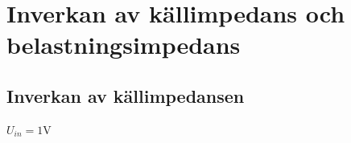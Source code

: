 %
%

\section{Inverkan av källimpedans och belastningsimpedans}\label{impedans}
% 

\subsection{Inverkan av källimpedansen}\label{Zin}



$U_{in} = 1 \si{\volt}$

